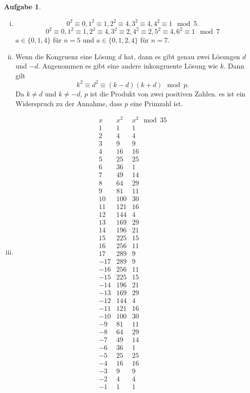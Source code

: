 \documentclass{article}
\theoremstyle{definition}
\newtheorem{ub}{Aufgabe}
\begin{document}
\begin{ub}
	\begin{enumerate}[(i)]
		\item 
		\[ 
		0^2 \equiv 0, 1^2 \equiv 1, 2^2 \equiv 4, 3^2 \equiv 4, 4^2 \equiv 1 \mod 5.
		 \]
		\[ 
		0^2 \equiv 0, 1^2 \equiv 1, 2^2\equiv 4, 3^2 \equiv 2, 4^2 \equiv 2, 5^2 \equiv 4, 6^2 \equiv 
		1 \mod 7
		 \]
		$ a \in \{ 0,1,4 \} $ f\"ur $ n=5 $ und $ a \in \{ 0,1,2,4 \} $ f\"ur $ n=7 $.
		\item 
		Wenn die Kongruenz eine L\"osung $ d $ hat, dann es gibt genau zwei L\"osungen $ d $ und
		$ -d $. Angenommen es gibt eine andere inkongruente L\"osung wie $ k $. Dann gilt
		\[ 
		k^2 \equiv d^2 \equiv (k-d)(k+d) \mod p.
		 \]
		Da $ k \neq d $ und $ k \neq -d $, $ p $ ist die Produkt von zwei positiven Zahlen. es ist ein Widerspruch zu der Annahme, dass $ p $ eine Primzahl ist.
		\item 
		\[ 
		\begin{array}{r|c|c}
			x & x^2 & x^2 \mod 35 \\ \hline
			1 & 1 & \boxed{1} \\
			2 & 4 & 4 \\
			3 & 9 & 9 \\
			4 & 16 & 16 \\
			5 & 25 & 25 \\
			6 & 36 & \boxed{1} \\
			7 & 49 & 14 \\
			8 & 64 & 29 \\
			9 & 81 & 11 \\
			10 & 100 & 30 \\
			11 & 121 & 16 \\
			12 & 144 & 4 \\
			13 & 169 & 29 \\
			14 & 196 & 21 \\
			15 & 225 & 15 \\
			16 & 256 & 11 \\
			17 & 289 & 9 \\
			-17 & 289 & 9 \\
			-16 & 256 & 11 \\
			-15 & 225 & 15 \\
			-14 & 196 & 21 \\
			-13 & 169 & 29 \\
			-12 & 144 & 4 \\
			-11 & 121 & 16 \\
			-10 & 100 & 30 \\
			-9 & 81 & 11 \\
			-8 & 64 & 29 \\
			-7 & 49 & 14 \\
			-6 & 36 & \boxed{1} \\
			-5 & 25 & 25 \\
			-4 & 16 & 16 \\
			-3 & 9 & 9 \\
			-2 & 4 & 4 \\
			-1 & 1 & \boxed{1}
		\end{array}
		 \]
	\end{enumerate}
\end{ub}
	
\end{document}
